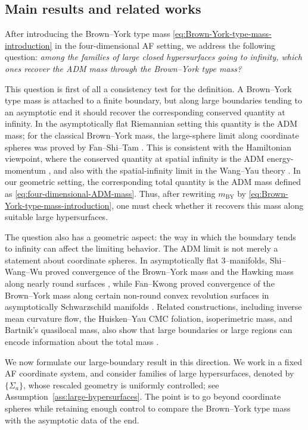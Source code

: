 \documentclass[10pt,a4paper]{amsart}
\newcommand{\BY}{\mathrm{BY}}
\begin{document}
	\subsection{Main results and related works}
	
	After introducing the Brown--York type mass \eqref{eq:Brown-York-type-mass-introduction} in the four-dimensional AF setting, we address the
	following question: \textit{among the families of large closed hypersurfaces going to infinity, which ones recover the ADM mass through the Brown--York type mass?}
	
	This question is first of all a consistency test for the definition. A
	Brown--York type mass is attached to a finite boundary, but along large
	boundaries tending to an asymptotic end it should recover the corresponding
	conserved quantity at infinity. In the asymptotically flat Riemannian setting
	this quantity is the ADM mass; for the classical Brown--York mass, the
	large-sphere limit along coordinate spheres was proved by Fan--Shi--Tam
	\cite{FanShiTam}. This is consistent with the Hamiltonian viewpoint, where the
	conserved quantity at spatial infinity is the ADM energy-momentum
	\cite{ADM,Szabados}, and also with the spatial-infinity limit in the
	Wang--Yau theory \cite{WangYau,WangYau09}. In our geometric setting, the corresponding
	total quantity is the ADM mass defined as \eqref{eq:four-dimensional-ADM-mass}. Thus, after rewriting $m_{\BY}$ by \eqref{eq:Brown-York-type-mass-introduction}, one must check
	whether it recovers this mass along suitable large hypersurfaces.
	
	The question also has a geometric aspect: the way in which the boundary
	tends to infinity can affect the limiting behavior. The ADM limit is not merely
	a statement about coordinate spheres. In asymptotically flat $3$--manifolds,
	Shi--Wang--Wu proved convergence of the Brown--York mass and the Hawking mass
	along nearly round surfaces \cite{ShiWangWu}, while Fan--Kwong proved
	convergence of the Brown--York mass along certain non-round convex revolution
	surfaces in asymptotically Schwarzschild manifolds
	\cite{FanKwong11,FanKwong13}. Related constructions, including inverse mean
	curvature flow, the Huisken--Yau CMC foliation, isoperimetric mass, and
	Bartnik's quasilocal mass, also show that large boundaries or large regions can
	encode information about the total mass
	\cite{HuiskenIlmanen,HuiskenYau,JaureguiLee,Bartnik89,McCormick24}.
	
	We now formulate our large-boundary result in this direction. We work in
	a fixed AF coordinate system, and consider families of large hypersurfaces, denoted by $\{\Sigma_a\}$, whose rescaled
	geometry is uniformly controlled; see Assumption~\ref{ass:large-hypersurfaces}. The point is to go beyond coordinate spheres while retaining enough control to compare the Brown--York type mass
	with the asymptotic data of the end.
	
\end{document}
